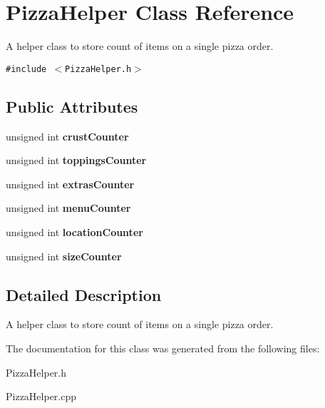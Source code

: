 \hypertarget{class_pizza_helper}{
\section{Pizza\-Helper Class Reference}
\label{class_pizza_helper}
}
A helper class to store count of items on a single pizza order.  


{\tt \#include $<$Pizza\-Helper.h$>$}

\subsection*{Public Attributes}
\begin{CompactItemize}
\item 
\hypertarget{class_pizza_helper_52b9d4656b374668f8dac25cdbdfd1e0}{
unsigned int {\bf crust\-Counter}}
\label{class_pizza_helper_52b9d4656b374668f8dac25cdbdfd1e0}

\item 
\hypertarget{class_pizza_helper_450c3826ea82a6622f93e6bdcc939268}{
unsigned int {\bf toppings\-Counter}}
\label{class_pizza_helper_450c3826ea82a6622f93e6bdcc939268}

\item 
\hypertarget{class_pizza_helper_34a07585521538b7d236fcce04fb998e}{
unsigned int {\bf extras\-Counter}}
\label{class_pizza_helper_34a07585521538b7d236fcce04fb998e}

\item 
\hypertarget{class_pizza_helper_e91a67288d9c8eaaa93feeebcfbd1d10}{
unsigned int {\bf menu\-Counter}}
\label{class_pizza_helper_e91a67288d9c8eaaa93feeebcfbd1d10}

\item 
\hypertarget{class_pizza_helper_225c04650660e2540bff4522e1c13627}{
unsigned int {\bf location\-Counter}}
\label{class_pizza_helper_225c04650660e2540bff4522e1c13627}

\item 
\hypertarget{class_pizza_helper_00e1b751a8e3e1d3b531bbbcd4e40948}{
unsigned int {\bf size\-Counter}}
\label{class_pizza_helper_00e1b751a8e3e1d3b531bbbcd4e40948}

\end{CompactItemize}


\subsection{Detailed Description}
A helper class to store count of items on a single pizza order. 



The documentation for this class was generated from the following files:\begin{CompactItemize}
\item 
Pizza\-Helper.h\item 
Pizza\-Helper.cpp\end{CompactItemize}

